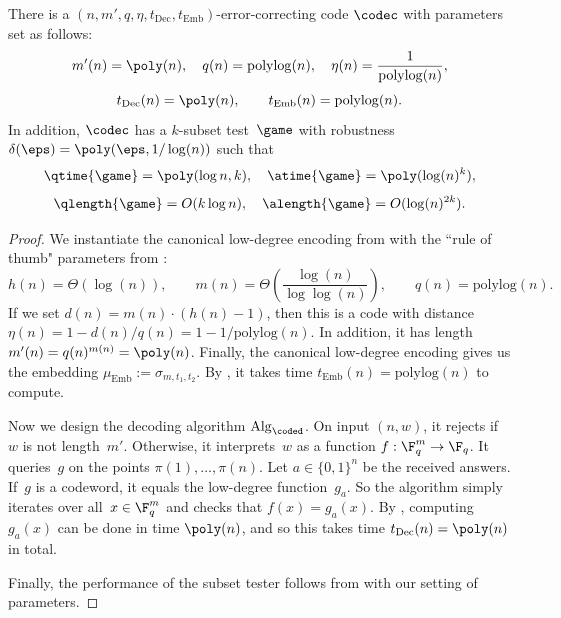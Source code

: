\begin{fact}\label{fact:low-degree-code-is-efficient}
There is a $(n, m', q, \eta, t_{\mathrm{Dec}}, t_{\mathrm{Emb}})$-error-correcting code $\codec$ with parameters set as follows:
\begin{equation*}
m'(n) = \poly(n), \quad q(n) = \mathrm{polylog}(n), \quad \eta(n) = \frac{1}{\mathrm{polylog}(n)},
\end{equation*}
\begin{equation*}
t_{\mathrm{Dec}}(n) = \poly(n), \qquad t_{\mathrm{Emb}}(n) = \mathrm{polylog}(n).
\end{equation*}
In addition, $\codec$ has a $k$-subset test~$\game$ with robustness $\delta(\eps) = \poly(\eps, 1/\log(n))$ such that
\begin{equation*}
\qtime{\game} = \poly(\log n, k),
\quad
\atime{\game} = \poly(\log(n)^k),
\end{equation*}
\begin{equation*}
\qlength{\game} = O(k \log n),
\quad
\alength{\game} = O(\log(n)^{2k}).
\end{equation*}
\end{fact}
\begin{proof}
We instantiate the canonical low-degree encoding from  with the ``rule of thumb" parameters from :
\begin{equation*}
h(n) = \Theta(\log(n)),
\qquad
m(n) = \Theta\left(\frac{\log(n)}{\log\log(n)}\right),
\qquad
q(n) = \mathrm{polylog}(n).
\end{equation*}
If we set $d(n) = m(n)\cdot (h(n) - 1)$, then this is a code with distance $\eta(n) = 1-d(n)/q(n) = 1-1/\mathrm{polylog}(n)$.
In addition, it has length $m'(n) = q(n)^{m(n)} = \poly(n)$.
Finally, the canonical low-degree encoding gives us the embedding $\mu_{\mathrm{Emb}} := \sigma_{m, t_1, t_2}$.
By , it takes time $t_{\mathrm{Emb}}(n) = \mathrm{poly log}(n)$ to compute.

Now we design the decoding algorithm $\mathrm{Alg}_{\coded}$.
On input $(n, w)$, it rejects if~$w$ is not length~$m'$.
Otherwise, it interprets~$w$ as a function $f:\F_q^m\rightarrow \F_q$.
It queries~$g$ on the points $\pi(1), \ldots, \pi(n)$.
Let $a \in \{0, 1\}^n$ be the received answers.
If~$g$ is a codeword, it equals the low-degree function~$g_a$.
So the algorithm simply iterates over all~$x \in \F_q^m$ and checks that $f(x) = g_a(x)$.
By , computing $g_a(x)$ can be done in time $\poly(n)$,
and so this takes time $t_{\mathrm{Dec}}(n) = \poly(n)$ in total.

Finally, the performance of the subset tester follows from  with our setting of parameters.
\end{proof}




